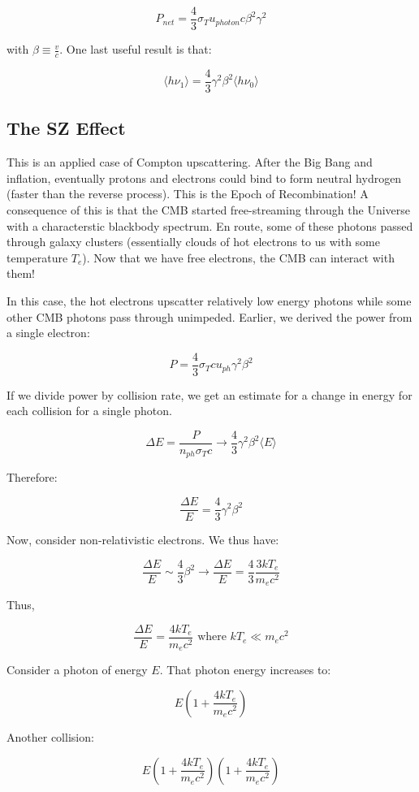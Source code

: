 \documentclass{article}
\begin{document}
$$
\boxed{P_{net} = \frac43 \sigma_T u_{photon} c \beta^2 \gamma^2}
$$

with $\beta \equiv \frac{v}{c}$. One last useful result is that:

$$
\boxed{\langle h \nu_1  \rangle = \frac43 \gamma^2 \beta^2 \langle h \nu_0 \rangle}
$$

\subsection{The SZ Effect}

This is an applied case of Compton upscattering. After the Big Bang and inflation, eventually protons and electrons could bind to form neutral hydrogen (faster than the reverse process). This is the Epoch of Recombination! A consequence of this is that the CMB started free-streaming through the Universe with a characterstic blackbody spectrum. En route, some of these photons passed through galaxy clusters (essentially clouds of hot electrons to us with some temperature $T_e$). Now that we have free electrons, the CMB can interact with them!

In this case, the hot electrons upscatter relatively low energy photons while some other CMB photons pass through unimpeded. Earlier, we derived the power from a single electron:

$$
P = \frac43 \sigma_T c u_{ph} \gamma^2 \beta^2
$$

If we divide power by collision rate, we get an estimate for a change in energy for each collision for a single photon.

$$
\Delta E = \frac{P}{n_{ph} \sigma_T c} \rightarrow \frac43 \gamma^2 \beta^2\langle E \rangle
$$

Therefore:

$$
\frac{\Delta E}{E} = \frac43 \gamma^2 \beta^2
$$

Now, consider non-relativistic electrons. We thus have:

$$
\frac{\Delta E}{E} \sim \frac43 \beta^2 \rightarrow \frac{\Delta E}{E} = \frac43 \frac{3kT_e}{m_e c^2}
$$

Thus, 

$$
\frac{\Delta E}{E} = \frac{4k T_e}{m_e c^2} \text{ where } kT_e \ll m_e c^2
$$

Consider a photon of energy $E$. That photon energy increases to:

$$
E\left(1 + \frac{4kT_e}{m_e c^2}\right)
$$

Another collision:

$$
E\left(1 + \frac{4kT_e}{m_e c^2}\right)\left(1 + \frac{4kT_e}{m_e c^2}\right)
$$
\end{document}
